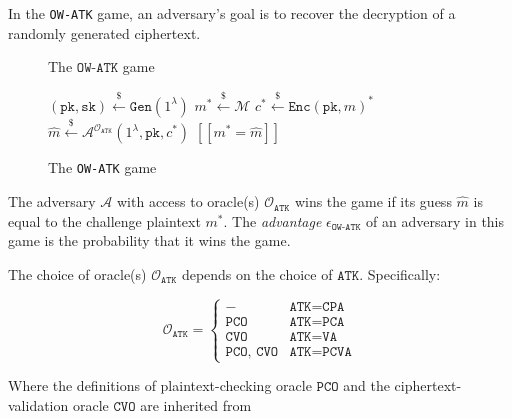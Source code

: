 \documentclass[floatrow,journal=tches,submission]{iacrtrans}
\newcommand{\monospace}{\texttt}
\newcommand{\keygen}{\monospace{Gen}}
\newcommand{\encrypt}{\monospace{Enc}}
\newcommand{\pk}{\monospace{pk}}
\newcommand{\sk}{\monospace{sk}}
\newcommand{\leftsample}{\stackrel{\$}{\leftarrow}}
\newcommand{\llbrack}{[\![}
\newcommand{\rrbrack}{]\!]}
\begin{document}
In the \monospace{OW-ATK} game, an adversary's goal is to recover the decryption of a randomly generated ciphertext.

\begin{figure}
    \centering

    \begin{algorithm}[H]
        \caption{
            The $\monospace{OW-ATK}$ game
        }\label{alg:pke-ow-atk-game}
        \begin{algorithmic}[1]
            \State $(\pk, \sk) \leftsample \keygen(1^\lambda)$
            \State $m^\ast \leftsample \mathcal{M}$
            \State $c^\ast \leftsample \encrypt(\pk, m)^\ast$
            \State $\hat{m} \leftsample \mathcal{A}^{\mathcal{O}_\monospace{ATK}}(1^\lambda, \pk, c^\ast)$
            \State \Return $\llbrack m^\ast = \hat{m} \rrbrack$
        \end{algorithmic}
    \end{algorithm}
    
    \caption{The \monospace{OW-ATK} game}
    \label{fig:pke-ow-atk-game}
\end{figure}

The adversary $\mathcal{A}$ with access to oracle(s) $\mathcal{O}_\monospace{ATK}$ wins the game if its guess $\hat{m}$ is equal to the challenge plaintext $m^\ast$. The \textit{advantage} $\epsilon_\monospace{OW-ATK}$ of an adversary in this game is the probability that it wins the game.

The choice of oracle(s) $\mathcal{O}_\monospace{ATK}$ depends on the choice of $\monospace{ATK}$. Specifically:

\begin{equation*}
    \mathcal{O}_\monospace{ATK} = \begin{cases}
        - & \monospace{ATK} = \monospace{CPA} \\
        \monospace{PCO} & \monospace{ATK} = \monospace{PCA} \\
        \monospace{CVO} & \monospace{ATK} = \monospace{VA} \\
        \monospace{PCO, CVO} & \monospace{ATK} = \monospace{PCVA}
    \end{cases}
\end{equation*}

Where the definitions of plaintext-checking oracle $\monospace{PCO}$ and the ciphertext-validation oracle $\monospace{CVO}$ are inherited from \cite{hofheinz2017modular}
\end{document}
